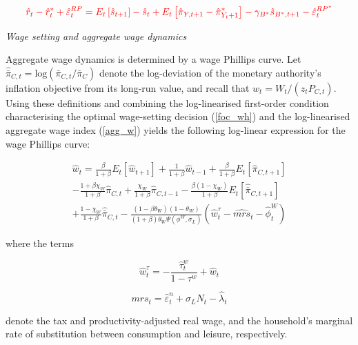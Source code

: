 \documentclass[a4paper,11pt]{article}
\numberwithin{equation}{section}
\begin{document}
	\begin{equation}{\color{red} \label{Eq:UIPloglin}
	\hat{r}_t-\hat{r}^*_t+\hat{\varepsilon}^{RP}_t=E_t\left[\hat{s}_{t+1}\right]-\hat{s}_t+E_t\left[\hat{\pi}_{Y,t+1}-\hat{\pi}^*_{Y_t+1}\right]-\gamma_{B^*}\hat{s}_{B^*,t+1}-\hat{\varepsilon}^{RP^*}_t }
	\end{equation}
	
	\vspace{8pt}
	\textit{Wage setting and aggregate wage dynamics}
	\vspace{8pt}
	
	Aggregate wage dynamics is determined by a wage Phillips curve. Let $\hat{\bar{\pi}}_{C,t}=\text{log}\left(\bar{\pi}_{C,t}/\bar{\pi}_C\right)$ denote the log-deviation of the monetary authority's inflation objective from its long-run value, and recall that $w_t=W_t/\left(z_tP_{C,t}\right)$. Using these definitions and combining the log-linearised first-order condition characterising the optimal wage-setting decision (\ref{foc_wh}) and the log-linearised aggregate wage index (\ref{agg_w}) yields the following log-linear expression for the wage Phillips curve:
	
	\begin{multline} \label{a_wage}
	\hat{w}_t=\frac{\beta}{1+\beta}E_t\left[\hat{w}_{t+1}\right]+\frac{1}{1+\beta}\hat{w}_{t-1}+\frac{\beta}{1+\beta}E_t\left[\hat{\pi}_{C,t+1}\right]\\
	-\frac{1+\beta\chi_W}{1+\beta}\hat{\pi}_{C,t}+\frac{\chi_W}{1+\beta}\hat{\pi}_{C,t-1}-\frac{\beta(1-\chi_W)}{1+\beta}E_t\left[\hat{\bar{\pi}}_{C,t+1}\right]\\
	+\frac{1-\chi_W}{1+\beta}\hat{\bar{\pi}}_{C,t}-\frac{(1-\beta\theta_W)(1-\theta_W)}{(1+\beta)\theta_W\Psi(\phi^W,\sigma_L)}\left(\hat{w}^{\tau}_t-\widehat{mrs}_t-\hat{\phi}^W_t\right)
	\end{multline}
	
	where the terms 
	
	\begin{equation*}
	\hat{w}^{\tau}_t=-\frac{\hat{\tau}^w_t}{1-\tau^w}+\hat{w}_t
	\end{equation*}
	
	\begin{equation*}
	\widehat{mrs}_t=\hat{\varepsilon}^n_t+\sigma_L\hat{N}_t-\hat{\lambda}_t
	\end{equation*}
	
	denote the tax and productivity-adjusted real wage, and the household's marginal rate of substitution between consumption and leisure, respectively. 
	
\end{document}
